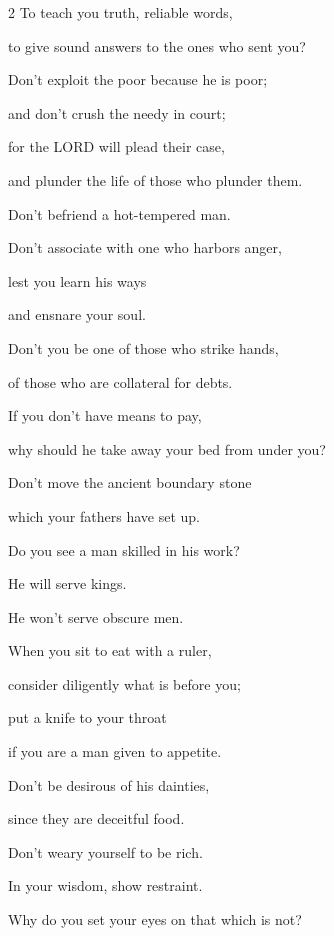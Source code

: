 \begin{multicols}{2}
\myverse{}To teach you truth, reliable words,

to give sound answers to the ones who sent you?


\vspace{\baselineskip} 
\myverse{}Don’t exploit the poor because he is poor;

and don’t crush the needy in court;


\myverse{}for the LORD will plead their case,

and plunder the life of those who plunder them.


\vspace{\baselineskip} 
\myverse{}Don’t befriend a hot-tempered man.

Don’t associate with one who harbors anger,


\myverse{}lest you learn his ways

and ensnare your soul.


\vspace{\baselineskip} 
\myverse{}Don’t you be one of those who strike hands,

of those who are collateral for debts.


\myverse{}If you don’t have means to pay,

why should he take away your bed from under you?


\vspace{\baselineskip} 
\myverse{}Don’t move the ancient boundary stone

which your fathers have set up.


\vspace{\baselineskip} 
\myverse{}Do you see a man skilled in his work?

He will serve kings.

He won’t serve obscure men.

\mychapter{} \myverse*{}When you sit to eat with a ruler,

\quad\quad consider diligently what is before you;


\myverse{}put a knife to your throat

if you are a man given to appetite.


\myverse{}Don’t be desirous of his dainties,

since they are deceitful food.


\myverse{}Don’t weary yourself to be rich.

In your wisdom, show restraint.


\myverse{}Why do you set your eyes on that which is not?


\end{multicols}
